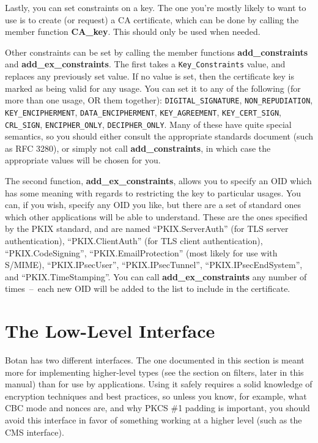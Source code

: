 \documentclass{article}
\newcommand{\function}[1]{\textbf{#1}}
\newcommand{\type}[1]{\texttt{#1}}
\begin{document}
Lastly, you can set constraints on a key. The one you're mostly likely to want
to use is to create (or request) a CA certificate, which can be done by calling
the member function \function{CA\_key}. This should only be used when needed.

Other constraints can be set by calling the member functions
\function{add\_constraints} and \function{add\_ex\_constraints}. The first
takes a \type{Key\_Constraints} value, and replaces any previously set
value. If no value is set, then the certificate key is marked as being valid
for any usage.  You can set it to any of the following (for more than one
usage, OR them together): \type{DIGITAL\_SIGNATURE}, \type{NON\_REPUDIATION},
\type{KEY\_ENCIPHERMENT}, \type{DATA\_ENCIPHERMENT}, \type{KEY\_AGREEMENT},
\type{KEY\_CERT\_SIGN}, \type{CRL\_SIGN}, \type{ENCIPHER\_ONLY},
\type{DECIPHER\_ONLY}. Many of these have quite special semantics, so you
should either consult the appropriate standards document (such as RFC 3280), or
simply not call \function{add\_constraints}, in which case the appropriate
values will be chosen for you.

The second function, \function{add\_ex\_constraints}, allows you to specify an
OID which has some meaning with regards to restricting the key to particular
usages. You can, if you wish, specify any OID you like, but there are a set of
standard ones which other applications will be able to understand. These are
the ones specified by the PKIX standard, and are named ``PKIX.ServerAuth'' (for
TLS server authentication), ``PKIX.ClientAuth'' (for TLS client
authentication), ``PKIX.CodeSigning'', ``PKIX.EmailProtection'' (most likely
for use with S/MIME), ``PKIX.IPsecUser'', ``PKIX.IPsecTunnel'',
``PKIX.IPsecEndSystem'', and ``PKIX.TimeStamping''. You can call
\function{add\_ex\_constraints} any number of times~--~each new OID will be
added to the list to include in the certificate.

\pagebreak
\section{The Low-Level Interface}

Botan has two different interfaces. The one documented in this section is meant
more for implementing higher-level types (see the section on filters, later in
this manual) than for use by applications. Using it safely requires a solid
knowledge of encryption techniques and best practices, so unless you know, for
example, what CBC mode and nonces are, and why PKCS \#1 padding is important,
you should avoid this interface in favor of something working at a higher level
(such as the CMS interface).
\end{document}

